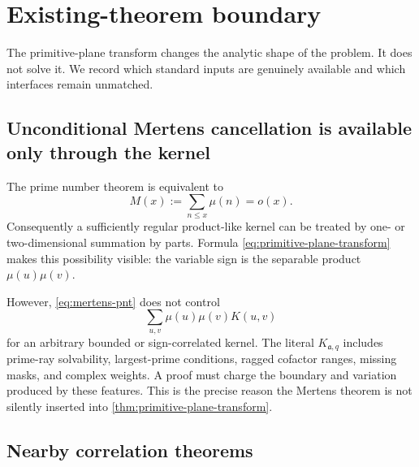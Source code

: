 \section{Existing-theorem boundary}
\label{sec:literature-boundary}

The primitive-plane transform changes the analytic shape of the problem.
It does not solve it.  We record which standard inputs are genuinely
available and which interfaces remain unmatched.

\subsection{Unconditional Mertens cancellation is available only through
the kernel}

The prime number theorem is equivalent to
\begin{equation}
 M(x):=\sum_{n\le x}\mu(n)=o(x).
 \label{eq:mertens-pnt}
\end{equation}
Consequently a sufficiently regular product-like kernel can be treated by
one- or two-dimensional summation by parts.  Formula
\eqref{eq:primitive-plane-transform} makes this possibility visible:
the variable sign is the separable product \(\mu(u)\mu(v)\).

However, \eqref{eq:mertens-pnt} does not control
\[
 \sum_{u,v}\mu(u)\mu(v)K(u,v)
\]
for an arbitrary bounded or sign-correlated kernel.  The literal
\(K_{\mathfrak a,q}\) includes prime-ray solvability, largest-prime
conditions, ragged cofactor ranges, missing masks, and complex weights.
A proof must charge the boundary and variation produced by these
features.  This is the precise reason the Mertens theorem is not silently
inserted into \cref{thm:primitive-plane-transform}.

\subsection{Nearby correlation theorems}

